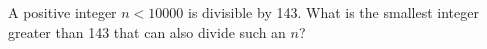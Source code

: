 A positive integer $n<10000$ is divisible by 143. What is the smallest integer greater than 143 that can also divide such an $n$?
